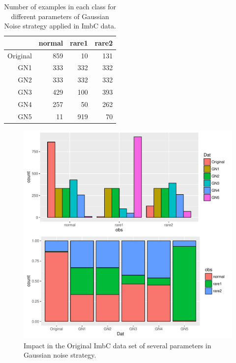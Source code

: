 \documentclass[10pt,a4paper]{article}\usepackage[]{graphicx}\usepackage[]{color}
\makeatletter
\def\maxwidth{ %
  \ifdim\Gin@nat@width>\linewidth
    \linewidth
  \else
    \Gin@nat@width
  \fi
}
\newenvironment{knitrout}{}{} %
\makeatother
\begin{document}
\begin{table}[ht]
\centering
\begin{tabular}{rrrr}
  \hline
 & normal & rare1 & rare2 \\ 
  \hline
Original & 859 &  10 & 131 \\ 
  GN1 & 333 & 332 & 332 \\ 
  GN2 & 333 & 332 & 332 \\ 
  GN3 & 429 & 100 & 393 \\ 
  GN4 & 257 &  50 & 262 \\ 
  GN5 &  11 & 919 &  70 \\ 
   \hline
\end{tabular}
\caption{Number of examples in each class for different parameters of Gaussian Noise strategy applied in ImbC data.} 
\label{tab:iris_GN_table}
\end{table}




\begin{knitrout}\footnotesize
{}\color{fgcolor}\begin{figure}

{\centering \includegraphics[width=\maxwidth,height=0.5\textheight]{figures/UBL-ir_GN_plot-1} 

}

\caption[Impact in the Original ImbC data set of several parameters in Gaussian noise strategy]{Impact in the Original ImbC data set of several parameters in Gaussian noise strategy. }\label{fig:ir_GN_plot}
\end{figure}


\end{knitrout}
\end{document}
